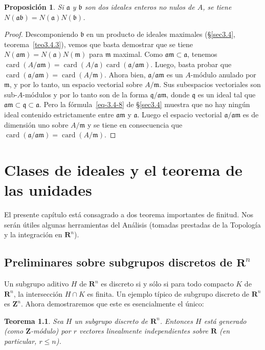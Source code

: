 \documentclass[10pt,oneside,bibtotoc,smallheadings,leqno,a5paper,DIV=12]{scrbook}
\newcommand{\RR}{\mathbf{R}}
\newcommand{\ZZ}{\mathbf{Z}}
\newcommand{\idl}[1]{\mathfrak{#1}}
\newcommand{\QED}{}%
\DeclareMathOperator{\card}{card}
\numberwithin{equation}{section}
\theoremstyle{defi}
\theoremstyle{enonce}
\newtheorem{theorem}{Teorema}
\newtheorem{proposition}{Proposici\'on}
\theoremstyle{rem}
\numberwithin{theorem}{section}
\numberwithin{proposition}{section}
\numberwithin{definition}{section}
\numberwithin{lemma}{section}
\numberwithin{corollary}{section}
\numberwithin{example}{section}
\numberwithin{footnote}{section}%
\begin{document}
\begin{proposition}\label{prop3.5.2}
Si $\idl{a}$ y $\idl{b}$ son dos ideales enteros no nulos de $A$, se tiene
$N(\idl{a}\idl{b}) = N(\idl{a})N(\idl{b})$.
\end{proposition}

\begin{proof}
Descomponiendo $\idl{b}$ en un producto de ideales maximales (\S\ref{sec3.4}, teorema~\ref{teo3.4.3}), vemos que
basta demostrar que se tiene $N(\idl{a}\idl{m}) = N(\idl{a})N(\idl{m})$ para $\idl{m}$ maximal.
Como $\idl{a}\idl{m}\subset\idl{a}$, tenemos $\card(A/\idl{a}\idl{m}) =
\card(A/\idl{a})\card(\idl{a}/\idl{a}\idl{m})$. Luego, basta probar que $\card(\idl{a}/\idl{a}\idl{m})
=\card(A/\idl{m})$. Ahora bien, $\idl{a}/\idl{a}\idl{m}$ es un $A$-m\'odulo anulado por $\idl{m}$, y por
lo tanto, un espacio vectorial sobre $A/\idl{m}$. Sus subespacios vectoriales son sub-$A$-m\'odulos y por
lo tanto son de la forma $\idl{q}/\idl{a}\idl{m}$, donde $\idl{q}$ es un ideal tal que
$\idl{a}\idl{m}\subset\idl{q}\subset\idl{a}$. Pero la f\'ormula~\eqref{eq-3.4-8} de \S\ref{sec3.4}
muestra que no hay
ning\'un ideal contenido estrictamente entre $\idl{a}\idl{m}$ y $\idl{a}$. Luego el espacio vectorial
$\idl{a}/\idl{a}\idl{m}$ es de dimensi\'on uno sobre $A/\idl{m}$ y se tiene en consecuencia que
$\card(\idl{a}/\idl{a}\idl{m}) = \card(A/\idl{m})$. \QED
\end{proof}

\chapter{Clases de ideales y el teorema de las unidades}\label{cap4}

El presente cap\'itulo est\'a consagrado a dos teorema importantes de finitud. Nos ser\'an
\'utiles algunas herramientas del An\'alisis (tomadas prestadas de la Topolog\'ia y la integraci\'on
en $\RR^{n}$).

\section{Preliminares sobre subgrupos discretos de $\RR^{n}$}\label{sec4.1}

Un subgrupo aditivo $H$ de $\RR^{n}$ es discreto si y s\'olo si para todo compacto $K$ de $\RR^{n}$,
la intersecci\'on $H\cap K$ es finita. Un ejemplo t\'ipico de subgrupo discreto de $\RR^{n}$ es $\ZZ^{n}$.
Ahora demostraremos que este es esencialmente el \'unico:

\begin{theorem}\label{teo4.1.1}
Sea $H$ un subgrupo discreto de $\RR^{n}$. Entonces $H$ est\'a generado {\upshape(}como $\ZZ$-m\'odulo\/{\upshape)} por
$r$ vectores linealmente independientes sobre $\RR$ {\upshape(}en particular, $r\leq n${\upshape).}
\end{theorem}
\end{document}
